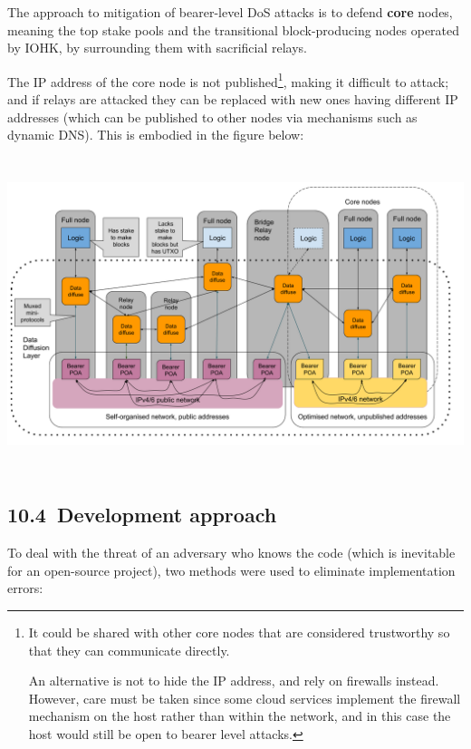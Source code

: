 \documentclass[]{article}
\begin{document}
The approach to mitigation of bearer-level DoS attacks is to defend
\textbf{core} nodes, meaning the top stake pools and the transitional
block-producing nodes operated by IOHK, by surrounding them with
sacrificial relays.

The IP address of the core node is not published\footnote{It could be
  shared with other core nodes that are considered trustworthy so that
  they can communicate directly.

  An alternative is not to hide the IP address, and rely on firewalls
  instead. However, care must be taken since some cloud services
  implement the firewall mechanism on the host rather than within the
  network, and in this case the host would still be open to bearer level
  attacks.}, making it difficult to attack; and if relays are attacked
they can be replaced with new ones having different IP addresses (which
can be published to other nodes via mechanisms such as dynamic DNS).
This is embodied in the figure below:

\includegraphics[width=6.26772in,height=3.61111in]{./media/image5.png}

\hypertarget{development-approach}{%
\subsection{​10.4​~Development approach}\label{development-approach}}

To deal with the threat of an adversary who knows the code (which is
inevitable for an open-source project), two methods were used to
eliminate implementation errors:
\end{document}
